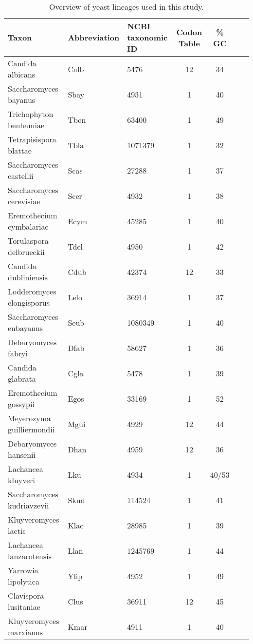 \begin{table}
    \centering
    \caption{Overview of yeast lineages used in this study.}
\begin{tabular}{  l  l  l  c  c  l  l  }
\hline
	Taxon 				& Abbreviation 	& NCBI taxonomic ID 	& Codon Table	& \% GC  \\ \hline
	Candida albicans 		& Calb 		& 5476 			&	12	& 34 	 \\
	Saccharomyces bayanus 		& Sbay 		& 4931 			&	1	& 40 	 \\
	Trichophyton benhamiae 		& Tben		& 63400 		&	1	& 49 	 \\
	Tetrapisispora blattae 		& Tbla 		& 1071379 		&	1	& 32 	 \\
	Saccharomyces castellii 	& Scas 		& 27288 		&	1	& 37 	 \\
	Saccharomyces cerevisiae 	& Scer 		& 4932 			&	1	& 38 	 \\
	Eremothecium cymbalariae 	& Ecym 		& 45285 		&	1	& 40 	 \\
	Torulaspora delbrueckii 	& Tdel 		& 4950 			&	1	& 42 	 \\
	Candida dubliniensis 		& Cdub 		& 42374 		&	12	& 33 	 \\
	Lodderomyces elongisporus 	& Lelo 		& 36914 		&	1	& 37 	 \\
	Saccharomyces eubayanus 	& Seub 		& 1080349 		&	1	& 40 	 \\ 
	Debaryomyces fabryi 		& Dfab 		& 58627 		&	1	& 36 	 \\ 
	Candida glabrata 		& Cgla 		& 5478 			&	1	& 39 	 \\
	Eremothecium gossypii 		& Egos 		& 33169 		&	1	& 52 	 \\
	Meyerozyma guilliermondii 	& Mgui 		& 4929 			&	12	& 44 	 \\
	Debaryomyces hansenii 		& Dhan 		& 4959 			&	12	& 36 	 \\
	Lachancea kluyveri 		& Lku 		& 4934 			&	1	& 40/53  \\
	Saccharomyces kudriavzevii 	& Skud 		& 114524 		&	1	& 41 	 \\
	Kluyveromyces lactis 		& Klac 		& 28985 		&	1	& 39 	 \\
	Lachancea lanzarotensis 	& Llan 		& 1245769 		&	1	& 44 	 \\ 
	Yarrowia lipolytica 		& Ylip 		& 4952 			&	1	& 49 	 \\
	Clavispora lusitaniae 		& Clus 		& 36911 		&	12	& 45 	 \\ 
	Kluyveromyces marxianus 	& Kmar 		& 4911 			&	1	& 40 	 \\ 

\end{tabular}
\end{table}
